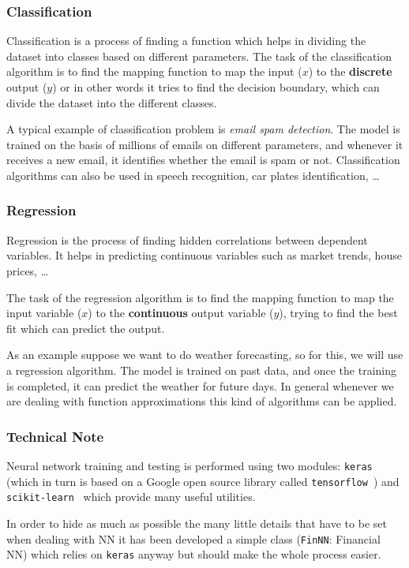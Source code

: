 \subsubsection{Classification}\label{classification}

Classification is a process of finding a function which helps in dividing
the dataset into classes based on different parameters. 
The task of the classification algorithm is to find the mapping function
to map the input (\(x\)) to the \textbf{discrete} output (\(y\)) or in other words
it tries to find the decision boundary, which can divide the dataset into the
different classes.

A typical example of classification problem is
\emph{email spam detection}. The model is trained on the basis of millions of
emails on different parameters, and whenever it receives a new email, it
identifies whether the email is spam or not. Classification algorithms can also be used in
speech recognition, car plates identification, \ldots

\subsubsection{Regression}\label{regression}

Regression is the process of finding hidden correlations between dependent
variables. It helps in predicting continuous
variables such as market trends, house prices, \ldots

The task of the regression algorithm is to find the mapping function to
map the input variable (\(x\)) to the \textbf{continuous} output
variable (\(y\)), trying to find the best fit which can predict the
output.

As an example suppose we want to do weather forecasting, so for this, we will
use a regression algorithm. The model is trained
on past data, and once the training is completed, it can predict the
weather for future days. In general whenever we are dealing with
function approximations this kind of algorithms can be applied.

\begin{attention}
\subsubsection{Technical Note}\label{technical-note}

Neural network training and testing is performed using two modules:
\texttt{keras}~\cite{bib:keras} (which in turn is based on a Google open source library
called \texttt{tensorflow}~\cite{bib:tensorflow}) and \texttt{scikit-learn}~\cite{bib:scikit} 
which provide many useful utilities.

In order to hide as much as possible the many little details that have to
be set when dealing with NN it has been developed a simple class
(\texttt{FinNN}: Financial NN) which relies on \texttt{keras} anyway 
but should make the whole process easier.
\end{attention}

